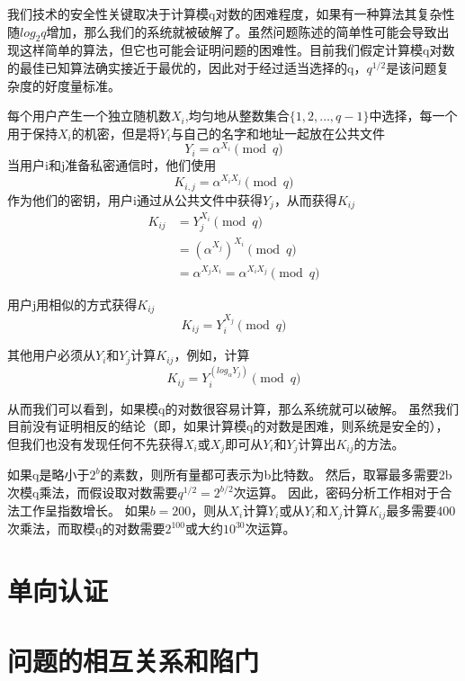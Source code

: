 \documentclass[]{article}
\begin{document}
	我们技术的安全性关键取决于计算模q对数的困难程度，如果有一种算法其复杂性随$log_2 q$增加，那么我们的系统就被破解了。虽然问题陈述的简单性可能会导致出现这样简单的算法，但它也可能会证明问题的困难性。目前我们假定计算模q对数的最佳已知算法确实接近于最优的，因此对于经过适当选择的q，$q^{1/2}$是该问题复杂度的好度量标准。
	
	每个用户产生一个独立随机数$X_i$,均匀地从整数集合$\{1,2,\ldots,q-1\}$中选择，每一个用于保持$X_i$的机密，但是将$Y_i$与自己的名字和地址一起放在公共文件
	\begin{equation}
		Y_i=\alpha ^{X_i} \pmod{q}
	\end{equation}
	当用户i和j准备私密通信时，他们使用
	\begin{equation}
		K_{i,j}=\alpha^{X_i X_j} \pmod{q}
	\end{equation}
	作为他们的密钥，用户i通过从公共文件中获得$Y_j$，从而获得$K_{ij}$
	\begin{align}
		K_{ij}&=Y_j^{X_i} \pmod{q}\\
		      &=(\alpha^{X_j})^{X_i} \pmod{q}\\
		      &=\alpha^{X_jX_i}=\alpha^{X_iX_j} \pmod{q}
	\end{align}
	
	
	用户j用相似的方式获得$K_{ij}$
	\begin{equation}
		K_{ij}=Y_i^{X_j} \pmod{q}
	\end{equation}
	
	其他用户必须从$Y_i$和$Y_j$计算$K_{ij}$，例如，计算
	\begin{equation}
		K_{ij}=Y_i^{(log_\alpha Y_j)} \pmod{q}
	\end{equation}
	
	从而我们可以看到，如果模q的对数很容易计算，那么系统就可以破解。
	虽然我们目前没有证明相反的结论（即，如果计算模q的对数是困难，则系统是安全的），但我们也没有发现任何不先获得$X_i$或$X_j$即可从$Y_i$和$Y_j$计算出$K_{ij}$的方法。
	
	
	如果q是略小于$2^b$的素数，则所有量都可表示为b比特数。
	然后，取幂最多需要2b次模q乘法，而假设取对数需要$q^{1/2}=2^{b/2}$次运算。
	因此，密码分析工作相对于合法工作呈指数增长。
	如果$b=200$，则从$X_i$计算$Y_i$或从$Y_i$和$X_j$计算$K_{ij}$最多需要400次乘法，而取模q的对数需要$2^{100}$或大约$10^{30}$次运算。
	
	\section{单向认证}
	
	\section{问题的相互关系和陷门}
	
\end{document}
